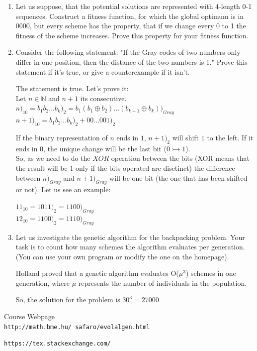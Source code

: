 \documentclass[12pt,english]{article}
\newenvironment{statement}{\fontfamily{ptm}\selectfont}{\par}
\begin{document}
\begin{enumerate}

	\item
		\begin{statement}
    Let us suppose, that the potential solutions are represented with 4-length 0-1 sequences. Construct a fitness function, for which the global optimum is in 0000, but every scheme has the property, that if we change every 0 to 1 the fitness of the scheme increases. Prove this property for your fitness function.
		\end{statement}


	\item
		\begin{statement}
    Consider the following statement: "If the Gray codes of two numbers only differ in one position, then the distance of the two numbers is 1." Prove this statement if it’s true, or give a counterexample if it isn’t.
		\end{statement}

    The statement is true. Let's prove it:\\
    Let $n \in \mathbb{N}$ and $n+1$ its consecutive.\\
		$n)_{10}=b_1b_2...b_k)_2=b_1(b_1 \oplus b_2)...(b_{k-1} \oplus b_k))_{Gray}$\\
		$n+1)_{10} = b_1b_2...b_k)_2 + 00...001)_2 $

		If the binary representation of $n$ ends in $1$, $n+1)_2$ will shift $1$ to the left. If it ends in $0$, the unique change will be the last bit ($0 \rightarrowtail 1$).\\

		So, as we need to do the $XOR$ operation between the bits (XOR means that the result will be $1$ only if the bits operated are disctinct) the difference between $n)_{Gray}$ and $n+1)_{Gray}$ will be one bit (the one that has been shifted or not). Let us see an example:

		$11_{10} = 1011)_2 = 1100)_{Gray}$\\
		$12_{10} = 1100)_2 = 1110)_{Gray}$\\


	\item
		\begin{statement}
    Let us investigate the genetic algorithm for the backpacking problem. Your task is to count how many schemes the algorithm evaluates per generation. (You can use your own program or modify the one on the homepage).
		\end{statement}

		Holland proved that a genetic algorithm evaluates O($\mu^3$) schemes in one generation, where $\mu$ represents the number of individuals in the population.

		So, the solution for the problem is $30^3 = 27000$


\end{enumerate}


\begin{thebibliography}{9}

Course Webpage
\\\texttt{http://math.bme.hu/~safaro/evolalgen.html}


\texttt{https://tex.stackexchange.com/}


\end{thebibliography}
\end{document}
